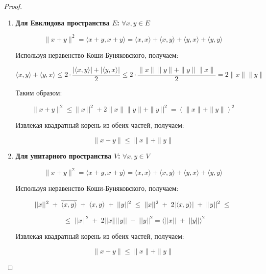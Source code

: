 \vspace{0.2cm}
\begin{proof}
    \begin{enumerate}
        \item \textbf{Для Евклидова пространства \( E \):} \quad \(\forall x, y \in E\)
        
        \[
        \|x + y\|^2 = \langle x + y, x + y \rangle = \langle x, x \rangle + \langle x, y \rangle + \langle y, x \rangle + \langle y, y \rangle
        \]
        
        Используя неравенство Коши-Буняковского, получаем:
        
        \[
        \langle x, y \rangle + \langle y, x \rangle \leq 2 \cdot \frac{|\langle x, y \rangle| + |\langle y, x \rangle|}{2} \leq 2 \cdot \frac{\|x\| \|y\| + \|y\| \|x\|}{2} = 2 \|x\| \|y\|
        \]
        
        Таким образом:
        
        \[
        \|x + y\|^2 \leq \|x\|^2 + 2 \|x\| \|y\| + \|y\|^2 = (\|x\| + \|y\|)^2
        \]
        
        Извлекая квадратный корень из обеих частей, получаем:
        
        \[
        \|x + y\| \leq \|x\| + \|y\|
        \]
        
        \item \textbf{Для унитарного пространства \( V \):} \quad \(\forall x, y \in V\)
        
        \[
        \|x + y\|^2 = \langle x + y, x + y \rangle = \langle x, x \rangle + \langle x, y \rangle + \langle y, x \rangle + \langle y, y \rangle
        \]
        
        Используя неравенство Коши-Буняковского, получаем:
        
        \[
        ||x||^2 \; + \; \overline{\langle x, y \rangle} \; + \; \langle x ,y \rangle \; + \; ||y||^2 \; \leq \; ||x||^2 \; + \; 2 |\langle x,y \rangle | \; + \; ||y||^2  \; \leq \newline 
        \]
        
        $$\; \leq \; ||x||^2 \; + \; 2 ||x|| ||y|| \; + \; ||y||^2 = \langle ||x|| \; + \; ||y|| \rangle^2$$
        
        
        Извлекая квадратный корень из обеих частей, получаем:
        
        
        $$\|x + y\| \leq \|x\| + \|y\|$$
        
   
        
    \end{enumerate}
\end{proof}

